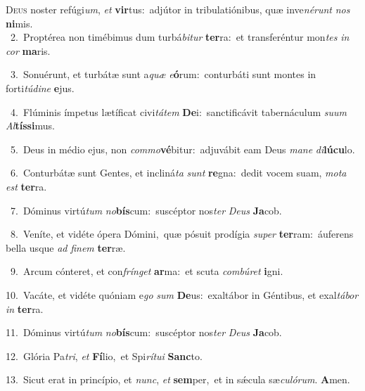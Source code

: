 \lettrine{\initial\textcolor{\initialcolor}{D}}{eus} noster refúgi\-\textit{um}\-, \textit{et} \textbf{vir}\-tus:~\star adjútor in tribulatiónibus, quæ inve\-\textit{né}\-\textit{runt} \textit{nos} \textbf{ni}\-mis.\\
{\numbfont\textcolor{\numbcolor}{~2.}}~Proptérea non timébimus dum turbá\-\textit{bi}\-\textit{tur} \textbf{ter}\-ra:~\star et transferéntur mon\textit{tes} \textit{in} \textit{cor} \textbf{ma}\-ris.\par
{\numbfont\textcolor{\numbcolor}{~3.}}~Sonuérunt, et turbátæ sunt a\textit{quæ} \textit{e}\-\textbf{ó}rum:~\star conturbáti sunt montes in forti\-\textit{tú}\-\textit{di}\textit{ne} \textbf{e}\-jus.\par
{\numbfont\textcolor{\numbcolor}{~4.}}~Flúminis ímpetus lætíficat civi\-\textit{tá}\-\textit{tem} \textbf{De}\-i:~\star sanctificávit tabernáculum \textit{su}\-\textit{um} \textit{Al}\-\textbf{tís}\textbf{si}mus.\par
{\numbfont\textcolor{\numbcolor}{~5.}}~Deus in médio ejus, non \textit{com}\-\textit{mo}\textbf{vé}bitur:~\star adjuvábit eam Deus \textit{ma}\-\textit{ne} \textit{di}\-\textbf{lú}\textbf{cu}lo.\par
{\numbfont\textcolor{\numbcolor}{~6.}}~Conturbátæ sunt Gentes, et incliná\textit{ta} \textit{sunt} \textbf{re}\-gna:~\star dedit vocem suam, \textit{mo}\-\textit{ta} \textit{est} \textbf{ter}\-ra.\par
{\numbfont\textcolor{\numbcolor}{~7.}}~Dóminus virtú\textit{tum} \textit{no}\-\textbf{bís}cum:~\star suscéptor nos\textit{ter} \textit{De}\-\textit{us} \textbf{Ja}\-cob.\par
{\numbfont\textcolor{\numbcolor}{~8.}}~Veníte, et vidéte ópera Dómini,~\dagger quæ pósuit prodígia \textit{su}\-\textit{per} \textbf{ter}\-ram:~\star áuferens bella usque \textit{ad} \textit{fi}\-\textit{nem} \textbf{ter}\-ræ.\par
{\numbfont\textcolor{\numbcolor}{~9.}}~Arcum cónteret, et con\-\textit{frín}\-\textit{get} \textbf{ar}\-ma:~\star et scuta \textit{com}\-\textit{bú}\textit{ret} \textbf{i}\-gni.\par
{\numbfont\textcolor{\numbcolor}{10.}}~Vacáte, et vidéte quóniam e\textit{go} \textit{sum} \textbf{De}\-us:~\star exaltábor in Géntibus, et exal\-\textit{tá}\-\textit{bor} \textit{in} \textbf{ter}\-ra.\par
{\numbfont\textcolor{\numbcolor}{11.}}~Dóminus virtú\textit{tum} \textit{no}\-\textbf{bís}cum:~\star suscéptor nos\textit{ter} \textit{De}\-\textit{us} \textbf{Ja}\-cob.\par
{\numbfont\textcolor{\numbcolor}{12.}}~Glória Pa\-\textit{tri}\-, \textit{et} \textbf{Fí}\-lio,~\star et Spi\-\textit{rí}\-\textit{tu}\textit{i} \textbf{Sanc}\-to.\par
{\numbfont\textcolor{\numbcolor}{13.}}~Sicut erat in princípio, et \textit{nunc}\-, \textit{et} \textbf{sem}\-per,~\star et in sǽcula sæ\-\textit{cu}\-\textit{ló}\textit{rum}. \textbf{A}\-men.\par
